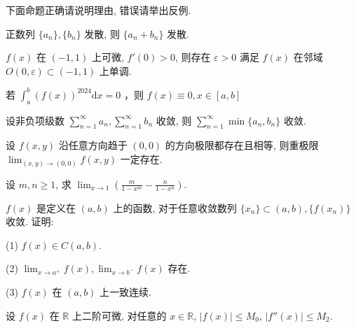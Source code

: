 \par{}
下面命题正确请说明理由, 错误请举出反例.\par
正数列 $\{a_{n}\}, \{b_{n}\}$ 发散, 则 $\{a_{n} + b_{n}\}$ 发散.\par
$f(x)$ 在 $(-1, 1)$ 上可微, $f'(0) > 0$, 则存在 $\varepsilon > 0$ 满足 $f(x)$ 在邻域 $O(0, \varepsilon) \subset (-1, 1)$ 上单调.\par
若 $\int_{a}^{b}(f(x))^{2024}\mathrm{d}x = 0$ ，则 $f(x)\equiv 0,x\in [a,b]$\par
设非负项级数 $\sum_{n=1}^{\infty} a_n, \sum_{n=1}^{\infty} b_n$ 收敛, 则 $\sum_{n=1}^{\infty} \min\{a_n, b_n\}$ 收敛.\par
设 $f(x, y)$ 沿任意方向趋于 $(0, 0)$ 的方向极限都存在且相等, 则重极限 $\lim_{(x, y) \to (0, 0)} f(x, y)$ 一定存在.\par
\par{}
设 $m, n \geq 1$, 求 $\lim_{x \to 1} \left( \frac{m}{1 - x^m} - \frac{n}{1 - x^n} \right)$.\par
\par{}
$f(x)$ 是定义在 $(a, b)$ 上的函数, 对于任意收敛数列 $\{x_{n}\} \subset (a, b), \{f(x_{n})\}$ 收敛. 证明:\par
(1) $f(x)\in C(a,b).$\par
(2) $\lim_{x\to a^{+}}f(x),\lim_{x\to b^{-}}f(x)$ 存在.\par
(3) $f(x)$ 在 $(a, b)$ 上一致连续.\par
\par{}
设 $f(x)$ 在 $\mathbb{R}$ 上二阶可微, 对任意的 $x \in \mathbb{R}$, $|f(x)| \leq M_0$, $|f''(x)| \leq M_2$.\par
